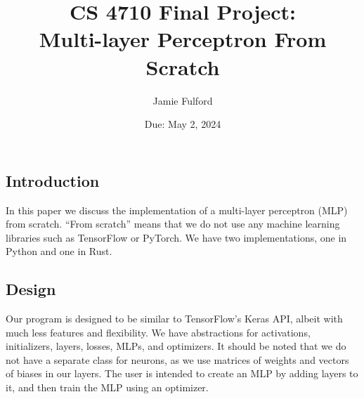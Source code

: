 \documentclass[12pt]{article}
\title{CS 4710 Final Project:\\Multi-layer Perceptron From Scratch}
\date{Due: May 2, 2024}
\author{Jamie Fulford}
\begin{document}
\maketitle

\subsection*{Introduction}

In this paper we discuss the implementation of a multi-layer perceptron (MLP) from scratch.
``From scratch'' means that we do not use any machine learning libraries such as TensorFlow or PyTorch.
We have two implementations, one in Python and one in Rust.

\subsection*{Design}

Our program is designed to be similar to TensorFlow's Keras API, albeit with much less features and flexibility.
We have abstractions for activations, initializers, layers, losses, MLPs, and optimizers.
It should be noted that we do not have a separate class for neurons, as we use matrices of weights and vectors of biases in our layers.
The user is intended to create an MLP by adding layers to it, and then train the MLP using an optimizer.

\begin{comment}
Here is a brief overview of the abstractions we use:
\begin{itemize}
    \item \texttt{Activation}: We have an abstract class for activation functions.
    \item \texttt{Initializer}: We also have an abstract class for weight initializers.
    \item \texttt{Layer}: A layer is a building block of a neural network. It has a forward pass and a backward pass.
    Instead of having a list of neurons, we have a matrix of weights and a vector of biases.
    Layers also have an activation function and a weight initializer.
    item \texttt{Loss}: A loss function is used to calculate the error of the network.
    \item \texttt{MLP}: An MLP is a sequence of layers. It has a forward pass and a backward pass.
    The forward pass just calls the forward pass of each layer in sequence, and the backward pass works similarly.
    However, the backward pass must return the gradients and deltas for each layer to the optimizer.
    The MLP also has a loss function.
    \item \texttt{Optimizer}: An optimizer is responsible for updating the weights and biases of the layers,
    as well as training the network through it's epochs.
    The optimizer has a learning rate and an MLP.
    Per our API, it is the optimizer's responsibility to call the forward and backward passes of the MLP.
\end{itemize}
\end{comment}
\end{document}
